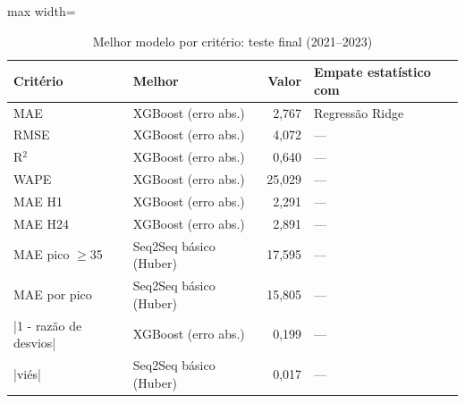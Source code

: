 \begin{table}[!htbp]
    \centering
    \caption{Melhor modelo por critério: teste final (2021--2023)}
    \label{tab:vitorias_holdout}
    \small
    \begin{adjustbox}{max width=\textwidth}
    \begin{tabular}{llrl}
        \toprule
        Critério & Melhor & Valor & Empate estatístico com \\
        \midrule
        MAE & XGBoost (erro abs.) & 2,767 & Regressão Ridge \\
        RMSE & XGBoost (erro abs.) & 4,072 & --- \\
        R$^2$ & XGBoost (erro abs.) & 0,640 & --- \\
        WAPE & XGBoost (erro abs.) & 25,029 & --- \\
        MAE H1 & XGBoost (erro abs.) & 2,291 & --- \\
        MAE H24 & XGBoost (erro abs.) & 2,891 & --- \\
        MAE pico $\geq$35 & Seq2Seq básico (Huber) & 17,595 & --- \\
        MAE por pico & Seq2Seq básico (Huber) & 15,805 & --- \\
        |1 - razão de desvios| & XGBoost (erro abs.) & 0,199 & --- \\
        |viés| & Seq2Seq básico (Huber) & 0,017 & --- \\
        \bottomrule
    \end{tabular}
    \end{adjustbox}
\end{table}
